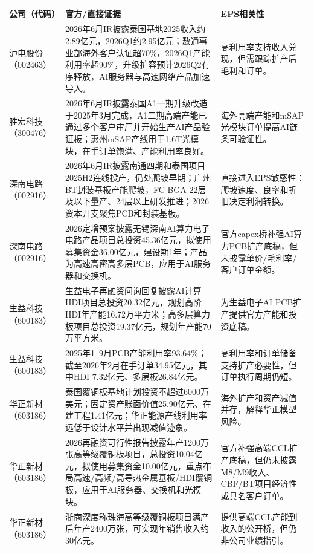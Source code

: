 \begin{exhibitbox}[图表6-10：官方资本开支和产能检查点]
\footnotesize
\begin{tabularx}{\textwidth}{L{1.8cm}X X}
\toprule
\textbf{公司（代码）} & \textbf{官方/直接证据} & \textbf{EPS相关性} \\
\midrule
沪电股份（002463） & 2026年6月IR披露泰国基地2025收入约2.89亿元，2026Q1约2.95亿元；数通事业部海外客户认证超70\%，2026Q1产能利用率超90\%，升级扩容预计2026Q2有序释放，AI服务器与高速网络产品加速导入。 & 高利用率支持收入兑现，但需跟踪扩产后毛利和订单。 \\
胜宏科技（300476） & 2026年6月IR披露泰国A1一期升级改造于2025年3月完成，A1二期高端产能已通过多个客户审厂并开始生产AI产品验证板；惠州mSAP产线用于1.6T光模块，在手订单饱满、产能利用率良好。 & 海外高端产能和mSAP光模块订单提高AI链条可验证性。 \\
深南电路（002916） & 2026年6月IR披露南通四期和泰国项目2025H2连线投产，仍处爬坡早期；广州BT封装基板产能爬坡，FC-BGA 22层及以下量产、24层以上研发推进；2026资本开支聚焦PCB和封装基板。 & 直接进入EPS敏感性：爬坡速度、良率和折旧决定利润转换。 \\
深南电路（002916） & 2026定增预案披露无锡深南AI算力电子电路产品项目总投资45.36亿元，拟使用募集资金36.00亿元，建设期1年；产品为高速高密高多层PCB，应用于AI服务器和交换机。 & 官方capex桥补强AI算力PCB扩产底稿，但未披露单价/毛利率/客户订单金额。 \\
生益科技（600183） & 生益电子再融资问询回复披露AI计算HDI项目总投资20.32亿元，规划高阶HDI年产能16.72万平方米；高多层算力板项目总投资19.37亿元，规划年产能70万平方米。 & 为生益电子AI PCB扩产提供官方产能和投资底稿。 \\
生益科技（600183） & 2025年1--9月PCB产能利用率93.64\%；截至2026年2月在手订单34.95亿元，其中HDI 7.32亿元、多层板26.84亿元。 & 高利用率和订单储备支持扩产必要性，但订单执行周期仍短。 \\
华正新材（603186） & 泰国覆铜板基地计划投资不超过6000万美元；固定资产账面价值25.90亿元、在建工程1.41亿元；华正能源产线利用率远低于设计水平并出现减值迹象。 & 海外扩产和资产减值并存，解释华正模型风险。 \\
华正新材（603186） & 2026再融资可行性报告披露年产1200万张高等级覆铜板项目，总投资10.04亿元，拟使用募集资金10.00亿元，重点布局高速/高频/高导热金属基板/HDI覆铜板，应用于AI服务器、交换机和光模块。 & 官方补强高端CCL扩产底稿，但仍未披露M8/M9收入、CBF/BT项目经济性或具名客户订单。 \\
华正新材（603186） & 浙商深度称珠海高等级覆铜板项目满产后年产2400万张，可实现年销售收入约30亿元。 & 提供高端CCL产能到收入的公开桥，但仍非公司业绩指引。 \\
\bottomrule
\end{tabularx}
\end{exhibitbox}

